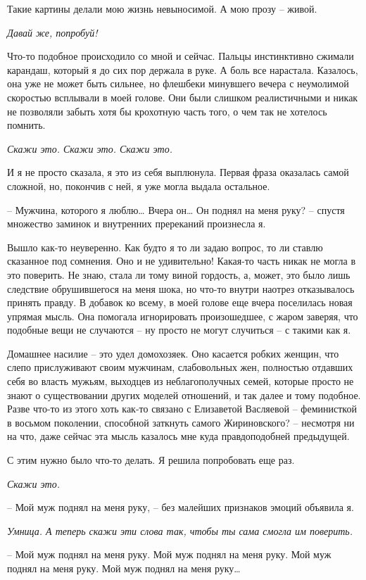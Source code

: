 \documentclass[
]{book}
\begin{document}
Такие картины делали мою жизнь невыносимой. А мою прозу -- живой.

\emph{Давай же, попробуй! }

Что-то подобное происходило со мной и сейчас. Пальцы инстинктивно сжимали карандаш, который я до сих пор держала в руке. А боль все нарастала. Казалось, она уже не может быть сильнее, но флешбеки минувшего вечера с неумолимой скоростью всплывали в моей голове. Они были слишком реалистичными и никак не позволяли забыть хотя бы крохотную часть того, о чем так не хотелось помнить.

\emph{Скажи это. Скажи это. Скажи это.}

И я не просто сказала, я это из себя выплюнула. Первая фраза оказалась самой сложной, но, покончив с ней, я уже могла выдала остальное.

-- Мужчина, которого я люблю\ldots{} Вчера он\ldots{} Он поднял на меня руку? -- спустя множество заминок и внутренних пререканий произнесла я.

Вышло как-то неуверенно. Как будто я то ли задаю вопрос, то ли ставлю сказанное под сомнения. Оно и не удивительно! Какая-то часть никак не могла в это поверить. Не знаю, стала ли тому виной гордость, а, может, это было лишь следствие обрушившегося на меня шока, но что-то внутри наотрез отказывалось принять правду. В добавок ко всему, в моей голове еще вчера поселилась новая упрямая мысль. Она помогала игнорировать произошедшее, с жаром заверяя, что подобные вещи не случаются -- ну просто не могут случиться -- с такими как я.

Домашнее насилие -- это удел домохозяек. Оно касается робких женщин, что слепо прислуживают своим мужчинам, слабовольных жен, полностью отдавших себя во власть мужьям, выходцев из неблагополучных семей, которые просто не знают о существовании других моделей отношений, и так далее и тому подобное. Разве что-то из этого хоть как-то связано с Елизаветой Васляевой -- феминисткой в восьмом поколении, способной заткнуть самого Жириновского? -- несмотря ни на что, даже сейчас эта мысль казалось мне куда правдоподобней предыдущей.

С этим нужно было что-то делать. Я решила попробовать еще раз.

\emph{Скажи это.}

-- Мой муж поднял на меня руку, -- без малейших признаков эмоций объявила я.

\emph{Умница. А теперь скажи эти слова так, чтобы ты сама смогла им поверить.}

-- Мой муж поднял на меня руку. Мой муж поднял на меня руку. Мой муж поднял на меня руку. Мой муж поднял на меня руку\ldots{}
\end{document}
